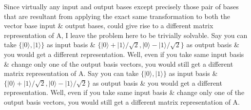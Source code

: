 \documentclass{article}
\begin{document}
Since virtually any input and output bases except precisely those pair of bases that are resultant from applying the exact same transformation to both the vector base input \& output bases, could give rise to a different matrix representation of A, I leave the problem here to be trivially solvable. Say you can take $\{|0\rangle, |1\rangle\}$ as input basis \& $\{|0\rangle+|1\rangle/\sqrt{2}, |0\rangle-|1\rangle/\sqrt{2}\}$ as output basis \& you would get a different representation. Well, even if you take same input basis \& change only one of the output basis vectors, you would still get a different matrix representation of A.
Say you can take $\{|0\rangle, |1\rangle\}$ as input basis \& $\{|0\rangle+|1\rangle/\sqrt{2}, |0\rangle-|1\rangle/\sqrt{2}\}$ as output basis \& you would get a different representation. Well, even if you take same input basis \& change only one of the output basis vectors, you would still get a different matrix representation of A.
\end{document}
